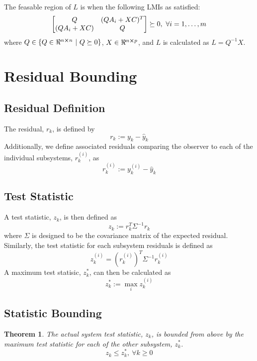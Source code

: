 \documentclass[]{article}
\newtheorem{theorem}{Theorem}
\begin{document}
The feasable region of $L$ is when the following LMIs as satisfied:
\begin{equation}\label{eq:L_feasable_LMIs}
    \mqty[
        Q &(Q A_i + X C)^T\\
        (Q A_i + X C) & Q
        ] \succeq 0, \ \forall i = 1, \dots, m
\end{equation}
where $Q \in \{Q \in \real^{n \cross n} \ | \ Q \succeq 0\}$, $X \in \real^{n \cross p}$, 
and $L$ is calculated as $L = Q^{-1} X$.

\section{Residual Bounding}
\subsection{Residual Definition}
The residual, $r_k$, is defined by
\begin{equation}\label{eq:r_k_def}
    r_k := y_k - \hat{y}_k
\end{equation}
Additionally, we define associated residuals comparing the observer to each of the 
individual subsystems, $r_k^{(i)}$, as
\begin{equation}\label{eq:r_k_i_def}
    r_k^{(i)} := y_k^{(i)} - \hat{y}_k
\end{equation}

\subsection{Test Statistic}
A test statistic, $z_k$, is then defined as
\begin{equation}\label{eq:z_k_def}
    z_k := r_k^T \Sigma^{-1} r_k
\end{equation}
where $\Sigma$ is designed to be the covariance matrix of the expected residual. 
Similarly, the test statistic for each subsystem residuals is defined as
\begin{equation}\label{eq:z_k_i_def}
    z_k^{(i)} = (r_k^{(i)})^T \Sigma^{-1} r_k^{(i)}  
\end{equation}
A maximum test statisic, $z_k^*$, can then be calculated as
\begin{equation}\label{eq:z_k_max_def}
    z_k^* := \max_i z_k^{(i)}
\end{equation}

\subsection{Statistic Bounding}
\begin{theorem}
    The actual system test statistic, $z_k$, is bounded from above by the maximum 
    test statistic for each of the other subsystem, $z_k^*$.
    \begin{equation}
        z_k \leq z_k^*, \ \forall k \geq 0
    \end{equation}
\end{theorem}
\end{document}
